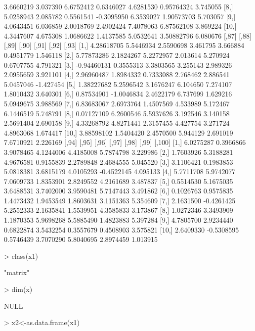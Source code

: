 \documentclass[12pt]{article}
\begin{document}
\begin{Schunk}
\begin{Soutput}
 [7,] 3.6660219  3.037390 6.6752412  0.6346027  4.6281530  0.95764324 3.745055
 [8,] 5.0258943  2.085782 0.5561541 -0.3095950  6.3539027  1.90573703 5.703057
 [9,] 4.0643451  6.036859 2.0018769  2.4902424  7.4078063  6.87562108 3.869224
[10,] 4.3447607  4.675308 1.0686622  1.4137585  5.0532641  3.50882796 6.080676
            [,87]      [,88]     [,89]    [,90]    [,91]     [,92]     [,93]
 [1,]  4.28618705  5.5446934 2.5590698 3.461795 3.666884 0.4951779  1.546118
 [2,]  5.77873286  2.1824267 5.2272957 2.013614 5.270924 0.6707755  4.791321
 [3,] -0.94460131  0.3555313 3.3803565 3.255143 2.989326 2.0955659  3.921101
 [4,]  2.96960487  1.8984332 0.7333088 2.768462 2.886541 5.0457046 -1.427454
 [5,]  1.38227682  5.2596542 3.1676247 6.104650 7.274107 1.8010432  3.640301
 [6,]  0.87534901 -1.0046834 2.4622179 6.737699 1.629216 5.0949675  3.988569
 [7,]  6.83683067  2.6973764 1.4507569 4.533989 5.172467 6.1446519  5.748791
 [8,]  0.07127109  6.2600546 5.5937626 3.192546 3.140158 2.5691404  2.690158
 [9,]  4.33268792  4.8271441 2.3157455 4.427754 3.271724 4.8963068  1.674417
[10,]  3.88598102  1.5404420 2.4570500 5.944129 2.691019 7.6710921  2.226169
          [,94]      [,95]     [,96]     [,97]     [,98]      [,99]   [,100]
 [1,] 6.0275287  0.3966866 3.9078465 4.1244006 4.4185008  5.7874798 3.229986
 [2,] 1.7603926  5.3188281 4.9676581 0.9155839 2.2789848  2.4684555 5.045520
 [3,] 3.1106421  0.1983853 5.0818381 3.6815179 4.0105293 -0.4522145 4.095133
 [4,] 5.7711708  5.9742077 7.0609733 1.8353901 2.8249552  4.2161689 3.487837
 [5,] 0.5514530  5.1675035 3.6488531 3.7402000 3.9590481  5.7147443 3.491862
 [6,] 0.1026763  0.9575835 1.4473432 1.9453549 1.8603631  3.1151363 5.354609
 [7,] 2.1631500 -0.4261425 5.2552333 2.1635841 1.5539951  4.3585833 3.173867
 [8,] 1.0272346  3.3493909 1.1870353 5.9698268 5.5885490  1.4823883 5.397284
 [9,] 4.7805700  2.9234440 0.6822874 3.5432254 0.3557679  0.4508903 3.575821
[10,] 2.6409330 -0.5308595 0.5746439 3.7070290 5.8040695  2.8974459 1.013915
\end{Soutput}
\begin{Sinput}
> class(x1)
\end{Sinput}
\begin{Soutput}
[1] "matrix"
\end{Soutput}
\begin{Sinput}
> dim(x)
\end{Sinput}
\begin{Soutput}
NULL
\end{Soutput}
\begin{Sinput}
> x2<-as.data.frame(x1)

\end{Sinput}
\end{Schunk}
\end{document}
